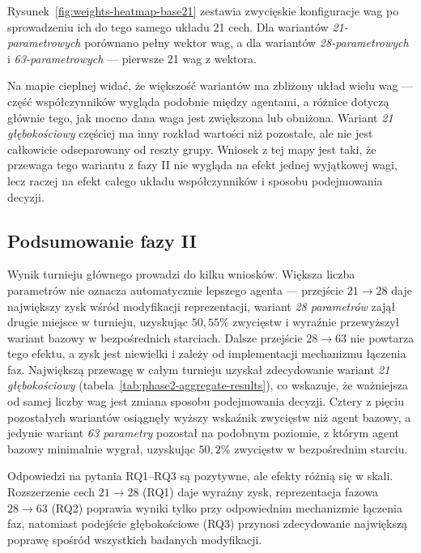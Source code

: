 

Rysunek~\ref{fig:weights-heatmap-base21} zestawia zwycięskie konfiguracje wag po sprowadzeniu ich do tego samego układu 21 cech. Dla wariantów \textit{21-parametrowych} porównano pełny wektor wag, a dla wariantów \textit{28-parametrowych} i \textit{63-parametrowych} --- pierwsze 21 wag z wektora.

Na mapie cieplnej widać, że większość wariantów ma zbliżony układ wielu wag --- część współczynników wygląda podobnie między agentami, a różnice dotyczą głównie tego, jak mocno dana waga jest zwiększona lub obniżona. Wariant \textit{21 głębokościowy} częściej ma inny rozkład wartości niż pozostałe, ale nie jest całkowicie odseparowany od reszty grupy. Wniosek z tej mapy jest taki, że przewaga tego wariantu z fazy II nie wygląda na efekt jednej wyjątkowej wagi, lecz raczej na efekt całego układu współczynników i sposobu podejmowania decyzji.

\subsection{Podsumowanie fazy II}

Wynik turnieju głównego prowadzi do kilku wniosków. Większa liczba parametrów nie oznacza automatycznie lepszego agenta --- przejście \(21 \rightarrow 28\) daje największy zysk wśród modyfikacji reprezentacji, wariant \textit{28 parametrów} zajął drugie miejsce w turnieju, uzyskując \(50{,}55\%\) zwycięstw i wyraźnie przewyższył wariant bazowy w bezpośrednich starciach. Dalsze przejście \(28 \rightarrow 63\) nie powtarza tego efektu, a zysk jest niewielki i zależy od implementacji mechanizmu łączenia faz. Największą przewagę w całym turnieju uzyskał zdecydowanie wariant \textit{21 głębokościowy} (tabela~\ref{tab:phase2-aggregate-results}), co wskazuje, że ważniejsza od samej liczby wag jest zmiana sposobu podejmowania decyzji. Cztery z pięciu pozostałych wariantów osiągnęły wyższy wskaźnik zwycięstw niż agent bazowy, a jedynie wariant \textit{63 parametry} pozostał na podobnym poziomie, z którym agent bazowy minimalnie wygrał, uzyskując \(50{,}2\%\) zwycięstw w bezpośrednim starciu.

Odpowiedzi na pytania RQ1--RQ3 są pozytywne, ale efekty różnią się w skali. Rozszerzenie cech \(21 \rightarrow 28\) (RQ1) daje wyraźny zysk, reprezentacja fazowa \(28 \rightarrow 63\) (RQ2) poprawia wyniki tylko przy odpowiednim mechanizmie łączenia faz, natomiast podejście głębokościowe (RQ3) przynosi zdecydowanie największą poprawę spośród wszystkich badanych modyfikacji.
